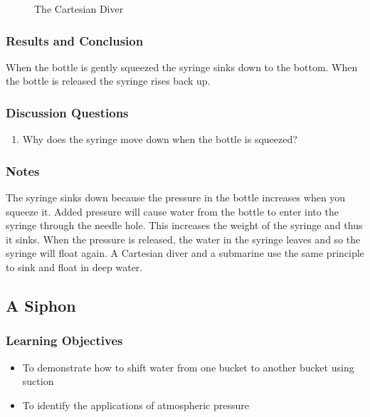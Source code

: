 \begin{figure}
\begin{center}
\def\svgwidth{150pt}

\caption{The Cartesian Diver}
\label{fig:cartesian-diver}
\end{center}
\end{figure}

\subsubsection*{Results and Conclusion}
When the bottle is gently squeezed the syringe sinks down to the bottom. When the bottle is released the syringe rises back up. 

\subsubsection*{Discussion Questions}
\begin{enumerate}
\item{Why does the syringe move down when the bottle is squeezed?}
\end{enumerate}

\subsubsection*{Notes}
The syringe sinks down because the pressure in the bottle increases when you squeeze it. Added pressure will cause water from the bottle to enter into the syringe through the needle hole. This increases the weight of the syringe and thus it sinks. When the pressure is released, the water in the syringe leaves and so the syringe will float again. A Cartesian diver and a submarine use the same principle to sink and float in deep water.


\subsection{A Siphon}

\subsubsection*{Learning Objectives}
\begin{itemize}
\item{To demonstrate how to shift water from one bucket to another bucket using suction} 
\item{To identify the applications of atmospheric pressure} 
\end{itemize}

